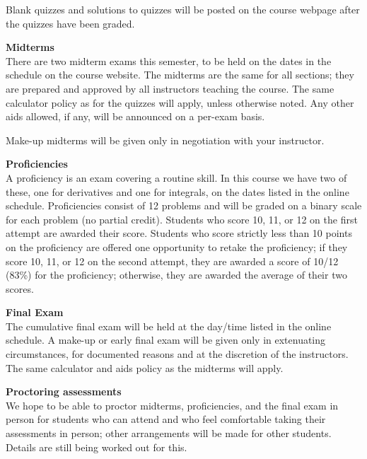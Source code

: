 \documentclass[12pt]{article}
\renewcommand{\emph}[1]{\textsf{\textbf{#1}}}
\newcommand{\localhead}[1]{\par\smallskip\textbf{#1}\nobreak\\}%
\def\heading#1{\localhead{\large\emph{#1}}}
\begin{document}
Blank quizzes and solutions to quizzes will be posted on the course webpage after the quizzes have been graded.

\heading{Midterms}
There are two midterm exams this semester, to be held on the dates in the schedule on the course website.  The midterms are the same for all sections; they are prepared and approved by all instructors teaching the course. The same
calculator policy as for the quizzes will apply, unless otherwise noted.
Any other aids allowed, if any, will be announced on a per-exam basis.

Make-up midterms will be given only in negotiation with your instructor.

\heading{Proficiencies}
A proficiency is an exam covering a routine skill.  In this course we have two of these, one for derivatives and one for integrals, on the dates listed in the online schedule.  Proficiencies consist of 12 problems and will be graded on a binary scale for each problem (no partial credit). Students who score 10, 11, or 12 on the first attempt are awarded their score. Students who score strictly less than 10 points on the proficiency are offered one opportunity to retake the proficiency; if they score 10, 11, or 12 on the second attempt, they are awarded a score of 10/12 (83\%) for the proficiency; otherwise, they are awarded the average of their two scores.   


\heading{Final Exam}
The cumulative final exam will be held at the day/time listed in the online schedule. A make-up or early final exam will be given only in extenuating circumstances, for documented reasons and at the discretion of the instructors.
The same calculator and aids policy as the midterms will apply.


\heading{Proctoring assessments}
We hope to be able to proctor midterms, proficiencies, and the final exam in person for students who can attend and who feel comfortable taking their assessments in person; other arrangements will be made for other students. Details are still being worked out for this.
\end{document}
